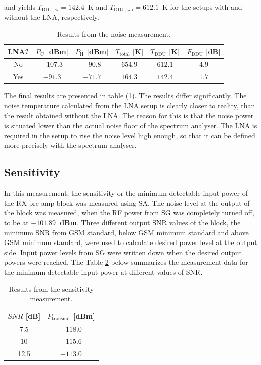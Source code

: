 \documentclass[a4paper, 12pt]{article}
\begin{document}
\noindent
and yields $T_{\mathrm{DDU, w}} = 142.4$~K and $T_{\mathrm{DDU, wo}} = 612.1$~K for the setups with and without the LNA, respectively.

\begin{table}[!h]
	\begin{center}
	\caption{Results from the noise measurement.}
	\label{t:noise}
	\renewcommand*{\arraystretch}{1.2}
	\begin{tabular}{cccccc}
	LNA? 			& $P_\mathrm{C}$ [dBm] 		& $P_\mathrm{H}$ [dBm]	& $T_\mathrm{total}$ [K] 	& $T_\mathrm{DDU}$ [K] 	& $F_\mathrm{DDU}$ [dB] \\
	\hline
	No				& $-107.3$					& $-90.8$				& $654.9$ 							& $612.1$ 						& $4.9$\\
	Yes				& $-91.3$					& $-71.7$				& $164.3$ 							& $142.4$ 						& $1.7$ 	
	\end{tabular}
	\end{center}
	\vspace*{-12pt}
\end{table}

\noindent
The final results are presented in table (1). The results differ significantly. The noise temperature calculated from the LNA setup is clearly closer to reality, than the result obtained without the LNA. The reason for this is that the noise power is situated lower than the actual noise floor of the spectrum analyser. The LNA is required in the setup to rise the noise level high enough, so that it can be defined more precisely with the spectrum analyser.

\subsection{Sensitivity}

In this measurement, the sensitivity or the minimum detectable input power of the RX pre-amp block was measured using SA. The noise level at the output of the block was measured, when the RF power from SG was completely turned off, to be at \textbf{$-101.89$~dBm}. Three different output SNR values of the block, the minimum SNR from GSM standard, below GSM minimum standard and above GSM minimum standard, were used to calculate desired power level at the output side. Input power levels from SG were written down when the desired output powers were reached. The Table \ref{t:sens} below summarizes the measurement data for the minimum detectable input power at different values of SNR.

\begin{table}[!h]
	\begin{center}
	\caption{Results from the sensitivity measurement.}
	\label{t:sens}
	\renewcommand*{\arraystretch}{1.2}
	\begin{tabular}{cc}
	$\mathit{SNR}$ [dB] 			& $P_\mathrm{transmit}$ [dBm]  \\
	\hline
	7.5								& $-118.0$ 	\\
	10								& $-115.6$ 	\\
	12.5							& $-113.0$ 	
	\end{tabular}
	\end{center}
	\vspace*{-12pt}
\end{table}
\end{document}
